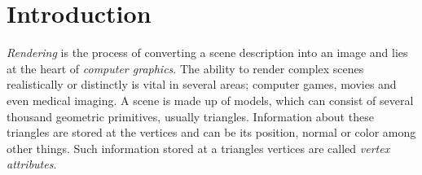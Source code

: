 


\chapter{Introduction}




\textit{Rendering} is the process of converting a scene description into an
image and lies at the heart of \textit{computer graphics}. The ability to render
complex scenes realistically or distinctly is vital in several areas; computer
games, movies and even medical imaging. A scene is made up of models, which can
consist of several thousand geometric primitives, usually triangles. Information
about these triangles are stored at the vertices and can be its position,
normal or color among other things. Such information stored at a triangles
vertices are called \textit{vertex attributes}.


